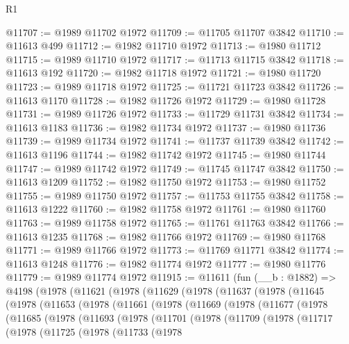 \begin{lexlean}{R1}
\begin{coremodule}
@11707 := @1989 @11702 @1972
@11709 := @11705 @11707 @3842
@11710 := @11613 @499
@11712 := @1982 @11710 @1972
@11713 := @1980 @11712
@11715 := @1989 @11710 @1972
@11717 := @11713 @11715 @3842
@11718 := @11613 @192
@11720 := @1982 @11718 @1972
@11721 := @1980 @11720
@11723 := @1989 @11718 @1972
@11725 := @11721 @11723 @3842
@11726 := @11613 @1170
@11728 := @1982 @11726 @1972
@11729 := @1980 @11728
@11731 := @1989 @11726 @1972
@11733 := @11729 @11731 @3842
@11734 := @11613 @1183
@11736 := @1982 @11734 @1972
@11737 := @1980 @11736
@11739 := @1989 @11734 @1972
@11741 := @11737 @11739 @3842
@11742 := @11613 @1196
@11744 := @1982 @11742 @1972
@11745 := @1980 @11744
@11747 := @1989 @11742 @1972
@11749 := @11745 @11747 @3842
@11750 := @11613 @1209
@11752 := @1982 @11750 @1972
@11753 := @1980 @11752
@11755 := @1989 @11750 @1972
@11757 := @11753 @11755 @3842
@11758 := @11613 @1222
@11760 := @1982 @11758 @1972
@11761 := @1980 @11760
@11763 := @1989 @11758 @1972
@11765 := @11761 @11763 @3842
@11766 := @11613 @1235
@11768 := @1982 @11766 @1972
@11769 := @1980 @11768
@11771 := @1989 @11766 @1972
@11773 := @11769 @11771 @3842
@11774 := @11613 @1248
@11776 := @1982 @11774 @1972
@11777 := @1980 @11776
@11779 := @1989 @11774 @1972
@11915 := @11611
    (fun (__b : @1882) =>
    @4198
      (@1978
        (@11621
          (@1978
            (@11629
              (@1978
                (@11637
                  (@1978
                    (@11645
                      (@1978
                        (@11653
                          (@1978
                            (@11661
                              (@1978
                                (@11669
                                  (@1978
                                    (@11677
                                      (@1978
                                        (@11685
                                          (@1978
                                            (@11693
                                              (@1978
                                                (@11701
                                                  (@1978
                                                    (@11709
                                                      (@1978
                                                        (@11717
                                                          (@1978
                                                            (@11725
                                                              (@1978
                                                                (@11733
                                                                  (@1978

\end{coremodule}
\end{lexlean}
